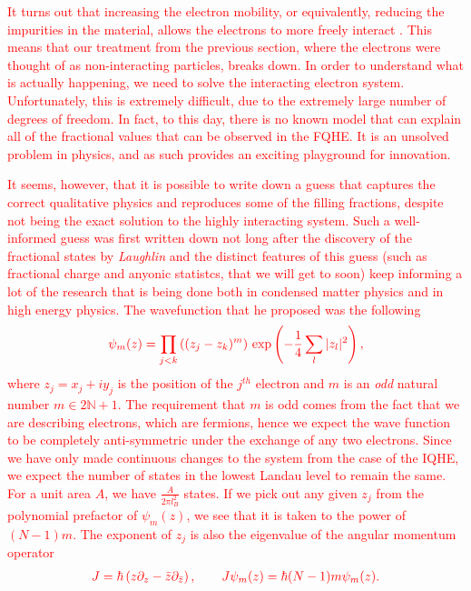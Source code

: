  \textcolor{red}{It turns out that increasing the electron mobility, or equivalently, reducing the impurities in the material, allows the electrons to more freely interact \cite{PhysRevB.37.8476}. This means that our treatment from the previous section, where the electrons were thought of as non-interacting particles, breaks down. In order to understand what is actually happening, we need to solve the interacting electron system. Unfortunately, this is extremely difficult, due to the extremely large number of degrees of freedom. In fact, to this day, there is no known model that can explain all of the fractional values that can be observed in the FQHE. It is an unsolved problem in physics, and as such provides an exciting playground for innovation.}
 
 \textcolor{red}{It seems, however, that it is possible to write down a guess that captures the correct qualitative physics and reproduces some of the filling fractions, despite not being the exact solution to the highly interacting system. Such a well-informed guess was first written down not long after the discovery of the fractional states by \textit{Laughlin} \cite{Laughlin:1983fy} and the distinct features of this guess (such as fractional charge and anyonic statistcs, that we will get to soon) keep informing a lot of the research that is being done both in condensed matter physics and in high energy physics. The wavefunction that he proposed was the following }
\begin{align}
    \textcolor{red}{\psi_m(z)= \prod_{j<k} \left((z_j -z_k)^m \right)\, \exp\left(- \frac{1}{4}\sum\limits_{l}|z_l|^2\right),}
\end{align}
 \textcolor{red}{where $z_j= x_j+iy_j$ is the position of the $j^{th}$ electron and $m$ is an \textit{odd} natural number $m \in 2\mathbb{N}+1$. The requirement that $m$ is odd comes from the fact that we are describing electrons, which are fermions, hence we expect the wave function to be completely anti-symmetric under the exchange of any two electrons. Since we have only made continuous changes to the system from the case of the IQHE, we expect the number of states in the lowest Landau level to remain the same. For a unit area $A$, we have $\frac{A}{2\pi l_B^2}$ states. If we pick out any given $z_j$ from the polynomial prefactor of $\psi_m(z)$, we see that it is taken to the power of $(N-1)m$. The exponent of $z_j$ is also the eigenvalue of the angular momentum operator}
\begin{align}
    \textcolor{red}{J = \hbar \left(z \partial_z -\bar{z} \partial_{\bar{z}}\right), \qquad J\psi_m(z) = \hbar (N-1)m \psi_m(z).}
\end{align}
